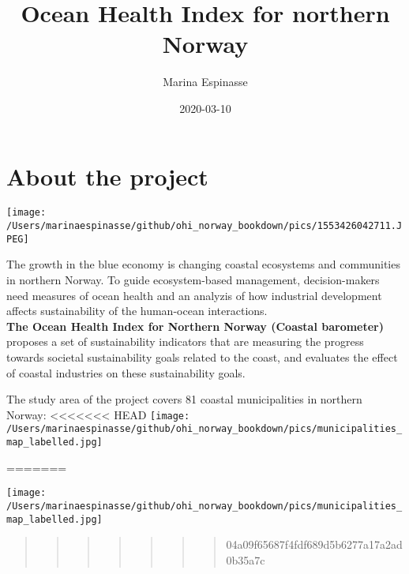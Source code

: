 \documentclass[
]{book}
\title{Ocean Health Index for northern Norway}
\author{Marina Espinasse}
\date{2020-03-10}
\begin{document}
\maketitle

{
\setcounter{tocdepth}{1}
\tableofcontents
}
\hypertarget{about-the-project}{%
\chapter{About the project}\label{about-the-project}}

\texttt{[image: /Users/marinaespinasse/github/ohi\_norway\_bookdown/pics/1553426042711.JPEG]}

The growth in the blue economy is changing coastal ecosystems and communities in northern Norway. To guide ecosystem-based management, decision-makers need measures of ocean health and an analyzis of how industrial development affects sustainability of the human-ocean interactions.\\
{\textbf{The Ocean Health Index for Northern Norway (Coastal barometer)}} proposes a set of sustainability indicators that are measuring
the progress towards societal sustainability goals related to the coast, and evaluates the effect of coastal industries on these sustainability goals.

The study area of the project covers 81 coastal municipalities in northern Norway:
\textless\textless\textless\textless\textless\textless\textless{} HEAD
\texttt{[image: /Users/marinaespinasse/github/ohi\_norway\_bookdown/pics/municipalities\_map\_labelled.jpg]}

=======

\texttt{[image: /Users/marinaespinasse/github/ohi\_norway\_bookdown/pics/municipalities\_map\_labelled.jpg]}

\begin{quote}
\begin{quote}
\begin{quote}
\begin{quote}
\begin{quote}
\begin{quote}
\begin{quote}
04a09f65687f4fdf689d5b6277a17a2ad0b35a7c
\end{quote}
\end{quote}
\end{quote}
\end{quote}
\end{quote}
\end{quote}
\end{quote}
\end{document}

